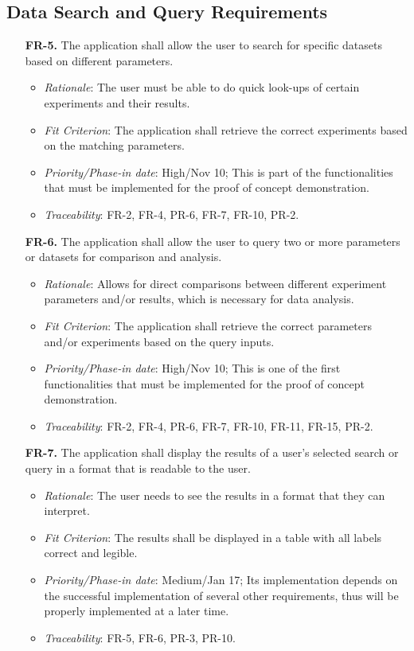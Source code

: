 \documentclass[12pt]{article}
\begin{document}
\subsection{Data Search and Query Requirements}
\begin{enumerate}
  \item[\textbf{FR-5.}] The application shall allow the user to search for specific datasets based on different parameters.
  \begin{itemize}
    \item \textit{Rationale}: The user must be able to do quick look-ups of certain experiments and their results.
    \item \textit{Fit Criterion}: The application shall retrieve the correct experiments based on the matching parameters.
    \item \textit{Priority/Phase-in date}: High/Nov 10; This is part of the functionalities that must be implemented for the proof of concept demonstration.
    \item \textit{Traceability}: FR-2, FR-4, PR-6, FR-7, FR-10, PR-2.
  \end{itemize}
  \item[\textbf{FR-6.}] The application shall allow the user to query two or more parameters or datasets for comparison and analysis.
  \begin{itemize}
    \item \textit{Rationale}: Allows for direct comparisons between different experiment parameters and/or results, which is necessary for data analysis.
    \item \textit{Fit Criterion}: The application shall retrieve the correct parameters and/or experiments based on the query inputs.
    \item \textit{Priority/Phase-in date}: High/Nov 10; This is one of the first functionalities that must be implemented for the proof of concept demonstration.
    \item \textit{Traceability}: FR-2, FR-4, PR-6, FR-7, FR-10, FR-11, FR-15, PR-2.
  \end{itemize}
  \item[\textbf{FR-7.}] The application shall display the results of a user’s selected search or query in a format that is readable to the user.
  \begin{itemize}
    \item \textit{Rationale}: The user needs to see the results in a format that they can interpret.
    \item \textit{Fit Criterion}: The results shall be displayed in a table with all labels correct and legible.
    \item \textit{Priority/Phase-in date}: Medium/Jan 17; Its implementation depends on the successful implementation of several other requirements, thus will be properly implemented at a later time.
    \item \textit{Traceability}: FR-5, FR-6, PR-3, PR-10.
  \end{itemize}
\end{enumerate}
\end{document}
